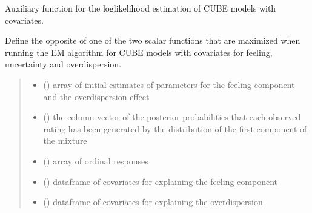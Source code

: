 \documentclass[letterpaper,10pt,english]{sphinxmanual}
\begin{document}

\begin{fulllineitems}
\label{\detokenize{cubmods:cubmods.cube_ywz.Qdue}}
\pysigstartsignatures
{}
\pysigstopsignatures
\sphinxAtStartPar
Auxiliary function for the log\sphinxhyphen{}likelihood estimation of CUBE models with covariates.

\sphinxAtStartPar
Define the opposite of one of the two scalar functions that are maximized when running the E\sphinxhyphen{}M 
algorithm for CUBE models with covariates for feeling, uncertainty and overdispersion.
\begin{quote}\begin{description}
\begin{itemize}
\item {} 
\sphinxAtStartPar
{} () \textendash{} array of initial estimates of parameters for the feeling component and the overdispersion effect

\item {} 
\sphinxAtStartPar
{} () \textendash{} the column vector of the posterior probabilities that each observed rating
has been generated by the distribution of the first component of the mixture

\item {} 
\sphinxAtStartPar
{} () \textendash{} array of ordinal responses

\item {} 
\sphinxAtStartPar
{} () \textendash{} dataframe of covariates for explaining the feeling component

\item {} 
\sphinxAtStartPar
{} () \textendash{} dataframe of covariates for explaining the overdispersion


\end{itemize}
\end{description}
\end{quote}
\end{fulllineitems}
\end{document}
